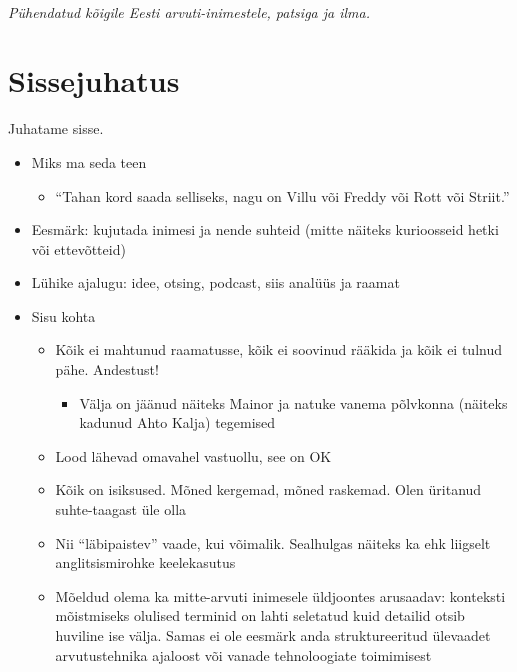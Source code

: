 \documentclass{tufte-book}
\begin{document}
\tableofcontents



\cleardoublepage
~\vfill
\begin{doublespace}
\noindent\fontsize{18}{22}\selectfont\itshape
\nohyphenation
Pühendatud kõigile Eesti arvuti-inimestele, patsiga ja ilma.
\end{doublespace}
\vfill
\vfill


\cleardoublepage
\chapter*{Sissejuhatus}
Juhatame sisse. 
\begin{itemize}
	\item Miks ma seda teen
	\begin{itemize}
		\item \enquote{Tahan kord saada selliseks, nagu on Villu või Freddy või Rott või Striit.}
	\end{itemize}
	\item Eesmärk: kujutada inimesi ja nende suhteid (mitte näiteks kurioosseid hetki või ettevõtteid)
	\item Lühike ajalugu: idee, otsing, podcast, siis analüüs ja raamat
	\item Sisu kohta
	\begin{itemize}
		\item Kõik ei mahtunud raamatusse, kõik ei soovinud rääkida ja kõik ei tulnud pähe. Andestust!
		\begin{itemize}
			\item Välja on jäänud näiteks Mainor ja natuke vanema põlvkonna (näiteks kadunud Ahto Kalja) tegemised
		\end{itemize}
		\item Lood lähevad omavahel vastuollu, see on OK
		\item Kõik on isiksused. Mõned kergemad, mõned raskemad. Olen üritanud suhte-taagast üle olla
		\item Nii \enquote{läbipaistev} vaade, kui võimalik. Sealhulgas näiteks ka ehk liigselt anglitsismirohke keelekasutus
		\item Mõeldud olema ka mitte-arvuti inimesele üldjoontes arusaadav: konteksti mõistmiseks olulised terminid on lahti seletatud kuid detailid otsib huviline ise välja. Samas ei ole eesmärk anda struktureeritud ülevaadet arvutustehnika ajaloost või vanade tehnoloogiate toimimisest

\end{itemize}
\end{itemize}
\end{document}
